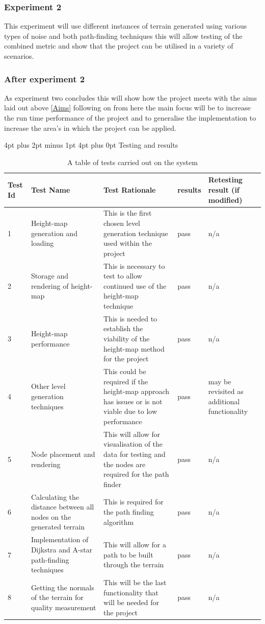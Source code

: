 \documentclass[12pt,a4paper]{article}
\makeatletter
\renewcommand\section{\@startsection {section}{1}{0mm} %
                               {4pt plus 2pt minus 1pt} %
                               {4pt plus 0pt} %
                               {\bfseries}}
\makeatother
\begin{document}
\subsubsection{Experiment 2}
This experiment will use different instances of terrain generated using various types of noise and both path-finding techniques this will allow testing of the combined metric and show that the project can be utilised in a variety of scenarios.

\subsubsection{After experiment 2} 
As experiment two concludes this will show how the project meets with the aims laid out above \ref{Aims} following on from here the main focus will be to increase the run time performance of the project and to generalise the implementation to increase the area's in which the project can be applied. 

\section{Testing and results}
\begin{table}[H]
\begin{tabular}{|p{0.8cm}|p{2cm}|p{5cm}|p{1.4cm}|p{2cm}|}
\hline
Test Id & Test Name & Test Rationale & results & Retesting result (if modified) \\
\hline
1 & Height-map generation and loading & This is the first chosen level generation technique used within the project & pass & n/a\\
\hline
2 & Storage and rendering of height-map & This is necessary to test to allow continued use of the height-map technique & pass & n/a\\
\hline
3 & Height-map performance & This is needed to establish the viability of the height-map method for the project & pass & n/a\\ 
\hline
4 & Other level generation techniques & This could be required if the height-map approach has issues or is not viable due to low performance & pass & may be revisited as additional functionality\\
\hline
5 & Node placement and rendering & This will allow for visualisation of the data for testing and the nodes are required for the path finder & pass & n/a\\ 
\hline
6 & Calculating the distance between all nodes on the generated terrain  & This is required for the path finding algorithm & pass & n/a\\
\hline
7 & Implementation of Dijkstra and A-star path-finding techniques &This will allow for a path to be built through the terrain & pass & n/a\\
\hline
8 & Getting the normals of the terrain for quality measurement& This will be the last functionality that will be needed for the project & pass & n/a\\
\hline   
\end{tabular} 
\caption{A table of tests carried out on the system}
\end{table}
\end{document}
